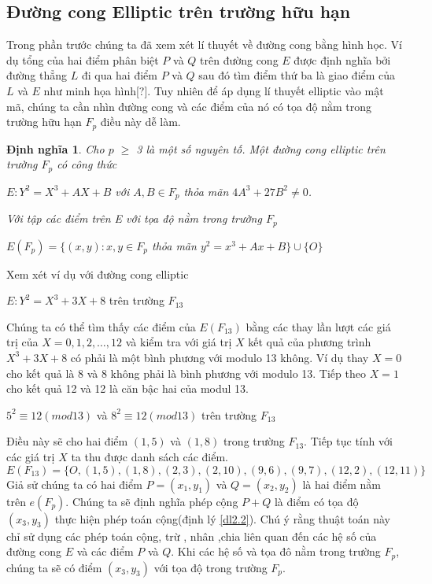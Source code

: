 \documentclass[a4paper,12pt]{report}
\newtheorem{definition}{Định nghĩa}[chapter]
\begin{document}
\subsection*{Đường cong Elliptic trên trường hữu hạn}
Trong phần trước chúng ta đã xem xét lí thuyết về đường cong bằng hình học. Ví dụ tổng của hai điểm phân biệt $P$ và $Q$ trên đường cong $E$ được định nghĩa bởi đường thẳng $L$ đi qua hai điểm $P$ và $Q$ sau đó tìm điểm thứ ba là giao điểm của $L$ và $E$ như minh họa hình[?]. Tuy nhiên để áp dụng lí thuyết elliptic vào mật mã, chúng ta cần nhìn đường cong và các điểm của nó có tọa độ nằm trong trường hữu hạn $F_p$ điều này dễ làm.
\begin{definition}
Cho $p$ $\geq$ 3 là một số nguyên tố. Một đường cong elliptic trên trường $F_p$ có công thức
\begin{center}
$E: Y^2 = X^3 + AX + B$ với $A, B \in F_p$ thỏa mãn $4A^3 + 27B^2 \neq  0$.
\end{center} 
Với tập các điểm trên E với tọa độ nằm trong trường $F_p$
\begin{center}
$E(F_p) = \{ (x, y): x, y \in F_p$ thỏa mãn $y^2 = x^3 + Ax + B \} \cup \{ O \}$
\end{center}
\end{definition}
Xem xét ví dụ với đường cong elliptic
\begin{center}
$E: Y^2 = X^3 + 3X + 8$ trên trường $F_{13}$
\end{center}
Chúng ta có thể tìm thấy các điểm của $E(F_{13})$ bằng các thay lần lượt các giá trị của $X = 0, 1, 2, \ldots, 12$ và kiểm tra với giá trị $X$ kết quả của phương trình $X^3 + 3X + 8$ có phải là một bình phương với modulo 13 không. Ví dụ thay $X = 0$ cho kết quả là 8 và 8 không phải là bình phương với modulo 13. Tiếp theo $X = 1$ cho kết quả 12 và 12 là căn bậc hai của modul 13.
\begin{center}
$5^2 \equiv 12 (mod 13)$ và $8^2 \equiv 12 (mod 13)$ trên trường $F_13$
\end{center}
Điều này sẽ cho hai điểm $(1, 5)$ và $(1, 8)$ trong trường $F_{13}$. Tiếp tục tính với các giá trị $X$ ta thu được danh sách các điểm.
\begin{displaymath}
E(F_{13}) = \{ O, (1, 5), (1, 8), (2, 3), (2, 10), (9, 6), (9, 7), (12, 2), (12, 11)\}
\end{displaymath}
Giả sử chúng ta có hai điểm $P = (x_1, y_1)$ và $Q = (x_2, y_2)$ là hai điểm nằm trên $e(F_p)$. Chúng ta sẽ định nghĩa phép cộng $P + Q$ là điểm có tọa độ $(x_3, y_3)$ thực hiện phép toán cộng(định lý \ref{dl2.2}). Chú ý rằng thuật toán này chỉ sử dụng các phép toán cộng, trừ , nhân ,chia liên quan đến các hệ số của đường cong $E$ và các điểm $P$ và $Q$. Khi các hệ số và tọa đô nằm trong trường $F_p$, chúng ta sẽ có điểm $(x_3, y_3)$ với tọa độ trong trường $F_p$.
\end{document}
